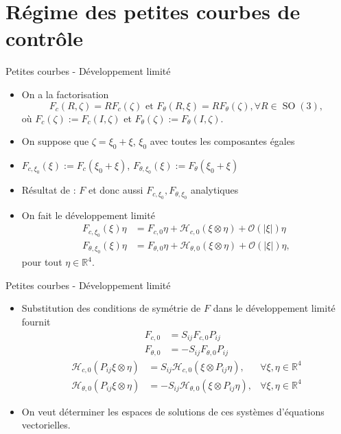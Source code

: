 \documentclass[10pt, envcountsect]{beamer}
\theoremstyle{plain}
\newcommand{\R}{\mathbb{R}}
\newcommand{\h}{\mathcal{H}}
\DeclareMathOperator{\SO}{SO}
\begin{document}
\section[Petites courbes]{Régime des petites courbes de contrôle}

\begin{frame}{Petites courbes - Développement limité}
\begin{itemize}
\item On a la factorisation
\begin{equation}
\label{eq: reminder control system}
	F_{c}(R, \zeta) = R F_{c}(\zeta) \text{ et } F_{\theta}(R, \xi) = R F_{\theta}(\zeta), \forall R \in \SO(3),
\end{equation}
où $F_{c}(\zeta) := F_c(I, \zeta)$ et $F_{\theta}(\zeta) := F_{\theta}(I, \zeta)$.
\item On suppose que $\zeta = \xi_0 + \xi$, $\xi_0$ avec toutes les composantes égales
\item $F_{c, \xi_0}(\xi) := F_{c}(\xi_0 + \xi)$, $F_{\theta, \xi_0}(\xi) := F_{\theta}(\xi_0 + \xi)$
\item Résultat de \cite{Alouges2013}: $F$ et donc aussi $F_{c, \xi_0}, F_{\theta, \xi_0}$ analytiques
\item On fait le développement limité
\begin{align}
\label{eq: spatial control expansion}
	F_{c, \xi_0}(\xi)\eta &= F_{c, 0} \eta  + \h_{c,0}(\xi \otimes \eta) + \mathcal{O}(|\xi|)\eta\\
\label{eq: angular control expansion}
	F_{\theta, \xi_0}(\xi) \eta &= F_{\theta, 0} \eta + \h_{\theta, 0}(\xi \otimes \eta) + \mathcal{O}(|\xi|)\eta,
\end{align}
pour tout $\eta \in \R^4$.
\end{itemize}
\end{frame}

\begin{frame}{Petites courbes - Développement limité}
\begin{itemize}
\item Substitution des conditions de symétrie de $F$ dans le développement limité fournit
\begin{align}
\label{eq:zeroth_order_sym}
	F_{c,0} &= S_{ij} F_{c,0} P_{ij}\\
	F_{\theta, 0} &= -S_{ij} F_{\theta, 0} P_{ij}
\end{align}
\begin{align}
\label{eq:first_order_sym}
\h_{c,0}(P_{ij} \xi\otimes \eta) &= S_{ij} \h_{c,0}(\xi \otimes P_{ij} \eta), &\forall \xi, \eta \in \R^4\\
\h_{\theta,0}(P_{ij} \xi \otimes \eta) &= -S_{ij} \h_{\theta,0}(\xi \otimes P_{ij} \eta), &\forall \xi, \eta \in \R^4
\end{align}
\item On veut déterminer les espaces de solutions de ces systèmes d'équations vectorielles.
\end{itemize}
\end{frame}
\end{document}
